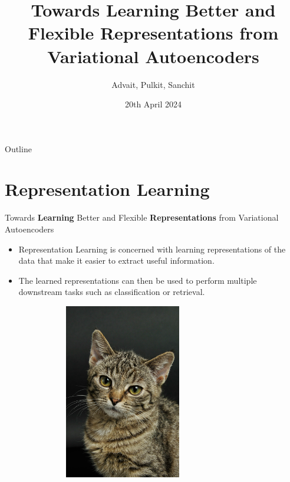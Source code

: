 \documentclass[hyperref={colorlinks,citecolor=blue,linkcolor=blue,urlcolor=blue}]{beamer}
\title{Towards Learning Better and Flexible Representations from Variational Autoencoders}
\author{Advait, Pulkit, Sanchit}
\institute{IIT Bombay}
\date{20th April 2024}
\begin{document}
\begin{frame}
  \titlepage
\end{frame}

\begin{frame}{Outline}
  \tableofcontents
  \singlespacing
\end{frame}

\section{Representation Learning}

\begin{frame}{ Towards \textbf{Learning} Better and Flexible \textbf{Representations} from Variational Autoencoders \vspace{0.3em}}
\begin{itemize}
  \item Representation Learning is concerned with learning representations of the data that make it easier to extract useful information.
  \item The learned representations can then be used to perform multiple downstream tasks such as classification or retrieval.
  \vspace{1em}
  \pause
  \begin{figure}
    \begin{subfigure}[b]{0.3\textwidth}
        \centering
        \includegraphics[width=0.6\textwidth,]{./Images/cat-image.jpeg}

\end{subfigure}
\end{figure}
\end{itemize}
\end{frame}
\end{document}
